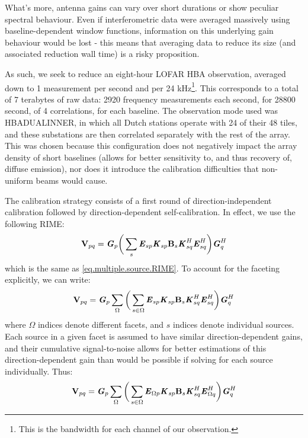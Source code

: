 \pg
What's more, antenna gains can vary over short durations or show peculiar spectral behaviour. Even if interferometric data were averaged massively using baseline-dependent window functions, information on this underlying gain behaviour would be lost - this means that averaging data to reduce its size (and associated reduction wall time) is a risky proposition.

\pg
As such, we seek to reduce an eight-hour LOFAR HBA observation, averaged down to 1 measurement per second and per 24 kHz\footnote{This is the bandwidth for each channel of our observation.}. This corresponds to a total of 7 terabytes of raw data: 2920 frequency measurements each second, for 28800 second, of 4 correlations, for each baseline. The observation mode used was HBA\textunderscore DUAL\textunderscore INNER, in which all Dutch stations operate with 24 of their 48 tiles, and these substations are then correlated separately with the rest of the array. This was chosen because this configuration does not negatively impact the array density of short baselines (allows for better sensitivity to, and thus recovery of, diffuse emission), nor does it introduce the calibration difficulties that non-uniform beams would cause.

\pg
The calibration strategy consists of a first round of direction-independent calibration followed by direction-dependent self-calibration. In effect, we use the following RIME:
\begin{equation}
\textbf{V}_{pq} = \textbf{\emph{G}}_p \bigg( \sum_s \textbf{\emph{E}}_{sp} \textbf{\emph{K}}_{sp} \textbf{B}_{s} \textbf{\emph{K}}_{sq}^H \textbf{\emph{E}}_{sq}^H \bigg) \textbf{\emph{G}}_q^H
\end{equation}
which is the same as \cref{eq.multiple.source.RIME}. To account for the faceting explicitly, we can write:
\begin{equation}
\textbf{V}_{pq} = \textbf{\emph{G}}_p \sum_{\Omega}\bigg( \sum_{s\in\Omega} \textbf{\emph{E}}_{sp} \textbf{\emph{K}}_{sp} \textbf{B}_{s} \textbf{\emph{K}}_{sq}^H \textbf{\emph{E}}_{sq}^H \bigg) \textbf{\emph{G}}_q^H
\end{equation}
where $\Omega$ indices denote different facets, and $s$ indices denote individual sources. Each source in a given facet is assumed to have similar direction-dependent gains, and their cumulative signal-to-noise allows for better estimations of this direction-dependent gain than would be possible if solving for each source individually. Thus:
\begin{equation}
\textbf{V}_{pq} = \textbf{\emph{G}}_p \sum_{\Omega}\bigg( \sum_{s\in\Omega} \textbf{\emph{E}}_{\Omega p} \textbf{\emph{K}}_{sp} \textbf{B}_{s} \textbf{\emph{K}}_{sq}^H \textbf{\emph{E}}_{\Omega q}^H \bigg) \textbf{\emph{G}}_q^H
\end{equation}

